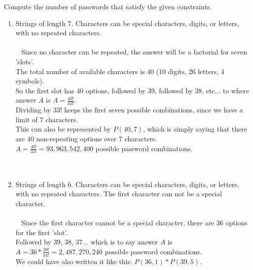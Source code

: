 \documentclass{amsart}
\theoremstyle{definition}
\theoremstyle{Exercise}
\theoremstyle{remark}
\theoremstyle{rule}
\numberwithin{equation}{section}
\begin{document}
Compute the number of passwords that satisfy the given constraints.
    \begin{enumerate}[label=(\roman*)]
    \item Strings of length 7. Characters can be special characters, digits, or letters, with no repeated characters.\\\\\
Since no character can be repeated, the answer will be a factorial for seven 'slots'.\\
The total number of available characters is 40 (10 digits, 26 letters, 4 symbols).\\
So the first slot has 40 options, followed by 39, followed by 38, etc... to where answer $A$ is $A = \frac{40!}{33!}$.\\
Dividing by 33! keeps the first seven possible combinations, since we have a limit of 7 characters.\\
This can also be represented by $P(40,7)$, which is simply saying that there are 40 non-repeating options over 7 characters.\\
$A = \frac{40!}{33!} = 93,963,542,400$ possible password combinations.
\\\\\
    \item Strings of length 6. Characters can be special characters, digits, or letters, with no repeated characters. The first character can not be a special character.\\\\\
Since the first character cannot be a special character, there are 36 options for the first 'slot'.\\
Followed by 39, 38, 37... which is to say answer $A$ is $A = 36*\frac{39!}{34!} = 2,487,270,240$ possible password combinations.\\
We could have also written it like this: $P(36,1) * P(39,5)$.
      \end{enumerate}
\\\\\
 \newpage
\end{document}
